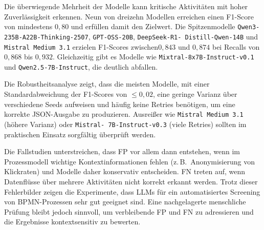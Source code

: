 Die überwiegende Mehrheit der Modelle kann kritische Aktivitäten mit hoher Zuverlässigkeit erkennen. Neun von dreizehn Modellen erreichen einen F1-Score von mindestens $0{,}80$ und erfüllen damit den Zielwert. Die Spitzenmodelle \texttt{Qwen3-235B-A22B-Thinking-2507}, \texttt{GPT-OSS-20B}, \texttt{DeepSeek-R1-\linebreak~Distill-Qwen-14B} und \texttt{Mistral Medium 3.1} erzielen F1-Scores zwischen\linebreak$0{,}843$ und $0{,}874$ bei Recalls von $0{,}868$ bis $0{,}932$. Gleichzeitig gibt es Modelle wie \texttt{Mixtral-8x7B-Instruct-v0.1} und \texttt{Qwen2.5-7B-Instruct}, die deutlich abfallen.

Die Robustheitsanalyse zeigt, dass die meisten Modelle, mit einer Standardabweichung der F1-Scores von $\leq 0{,}02$, eine geringe Varianz über verschiedene Seeds aufweisen und häufig keine Retries benötigen, um eine korrekte JSON-Ausgabe zu produzieren. Ausreißer wie \texttt{Mistral Medium 3.1} (höhere Varianz) oder \texttt{Mistral-\linebreak~7B-Instruct-v0.3} (viele Retries) sollten im praktischen Einsatz sorgfältig überprüft werden.

Die Fallstudien unterstreichen, dass \ac{FP} vor allem dann entstehen, wenn im Prozessmodell wichtige Kontextinformationen fehlen (z.\,B.\ Anonymisierung von Klickraten) und Modelle daher konservativ entscheiden. \ac{FN} treten auf, wenn Datenflüsse über mehrere Aktivitäten nicht korrekt erkannt werden. Trotz dieser Fehlerbilder zeigen die Experimente, dass \acp{LLM} für ein automatisiertes Screening von \ac{BPMN}-Prozessen sehr gut geeignet sind. Eine nachgelagerte menschliche Prüfung bleibt jedoch sinnvoll, um verbleibende \ac{FP} und \ac{FN} zu adressieren und die Ergebnisse kontextsensitiv zu bewerten.